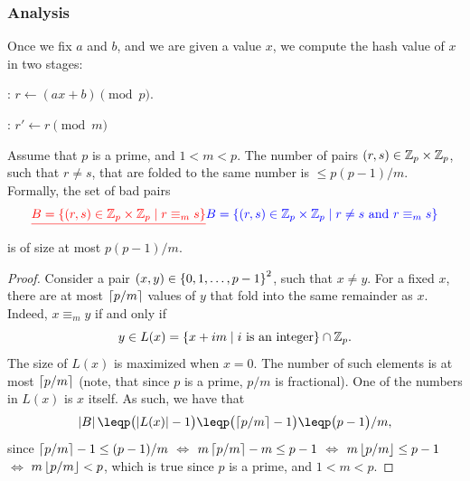 \subsubsection{Analysis}

Once we fix $a$ and $b$, and we are given a value $x$, we compute the
hash value of $x$ in two stages:
\begin{compactenumA}
    \item {}: $r \leftarrow (a x + b) \pmod p$.
    
    \item {}: $r' \leftarrow r \pmod m$%
\end{compactenumA}

\begin{lemma}
    Assume that $p$ is a prime, and $1 < m < p$.  The number of pairs
    $(r,s) \in \mathbb{Z}_p \times \mathbb{Z}_p$, such that $r \neq s$, that are
    folded to the same number is $\leq p(p-1)/m$.  Formally, the set
    of bad pairs
    \begin{equation*}
        \chgY{B = \Set{(r,s) \in \ZZ_p \times \ZZ_p}{ r \equiv_m s  }}{B = \Set{(r,s) \in \ZZ_p \times \ZZ_p}{ r \neq s \text{ and } r \equiv_m s  }}
    \end{equation*}
    is of size at most $p(p-1)/m$.
\end{lemma}
\begin{proof}
    Consider a pair $(x,y) \in \left\{ {0, 1,\ldots, p-1} \right\}^2$, such that
    $x \neq y$. For a fixed $x$, there are at most $\left\lceil {p/m} \right\rceil$ values
    of $y$ that fold into the same remainder as $x$. Indeed, $x \equiv_m y$ if and only if
    \begin{equation*}
        y \in L(x) = \left\{ x + im  \;\middle\vert\; i \text { is an integer} \right\} \cap \mathbb{Z}_p.
    \end{equation*}
    The size of $L(x)$ is maximized when $x = 0$. The number of such
    elements is at most $\left\lceil {p/m} \right\rceil$ (note, that since $p$ is a prime,
    $p/m$ is fractional).  One of the numbers in $L(x)$ is $x$ itself.
    As such, we have that
    \begin{equation*}
        \cardin{B}%
        \leq%
        p \bigl(\cardin{L(x)}  - 1 \bigr)%
        \leq%
        p \bigl(\ceil{p/m} - 1 \bigr)
        \leq%
        p \bigl(p - 1 \bigr)/m,
    \end{equation*}
    since
    $\left\lceil {p/m} \right\rceil - 1 \leq (p-1)/m$
    $\iff$
    $m\left\lceil {p/m} \right\rceil - m \leq p-1$
    $\iff$
    $m\left\lfloor {p/m} \right\rfloor \leq p-1$
    $\iff$
    $m\left\lfloor {p/m} \right\rfloor < p$,
    which is true since $p$ is a prime, and $1 <m < p$.    
\end{proof}


